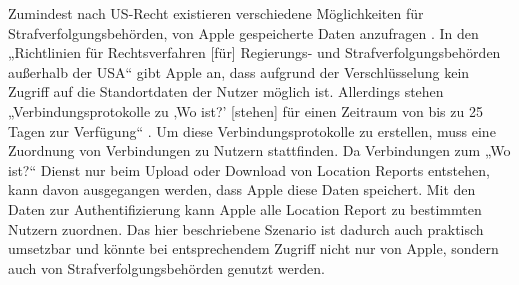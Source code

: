 Zumindest nach US-Recht existieren verschiedene Möglichkeiten für Strafverfolgungsbehörden, von Apple gespeicherte Daten anzufragen \cite{Data_Access}.
In den „Richtlinien für Rechtsverfahren [für] Regierungs- und Strafverfolgungsbehörden außerhalb der USA“ \cite{Apple_FindMy_Data} gibt Apple an, dass aufgrund der Verschlüsselung kein Zugriff auf die Standortdaten der Nutzer möglich ist.
Allerdings stehen „Verbindungsprotokolle zu ‚Wo ist?’ [stehen] für einen Zeitraum von bis zu 25 Tagen zur Verfügung“ \cite{Apple_FindMy_Data}.
Um diese Verbindungsprotokolle zu erstellen, muss eine Zuordnung von Verbindungen zu Nutzern stattfinden.
Da Verbindungen zum „Wo ist?“ Dienst nur beim Upload oder Download von Location Reports entstehen, kann davon ausgegangen werden, dass Apple diese Daten speichert.
Mit den Daten zur Authentifizierung kann Apple alle Location Report zu bestimmten Nutzern zuordnen.
Das hier beschriebene Szenario ist dadurch auch praktisch umsetzbar und könnte bei entsprechendem Zugriff nicht nur von Apple, sondern auch von Strafverfolgungsbehörden genutzt werden.




